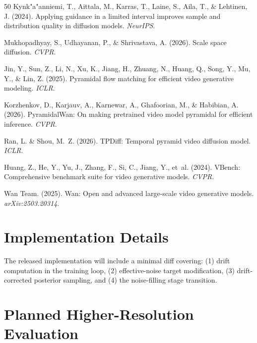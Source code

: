 \documentclass[10pt]{article}
\begin{document}
\begin{thebibliography}{50}
Kynk{"a}{"a}nniemi, T., Aittala, M., Karras, T., Laine, S., Aila, T., \& Lehtinen, J. (2024).
\newblock Applying guidance in a limited interval improves sample and distribution quality in diffusion models.
\newblock \emph{NeurIPS}.

Mukhopadhyay, S., Udhayanan, P., \& Shrivastava, A. (2026).
\newblock Scale space diffusion.
\newblock \emph{CVPR}.

Jin, Y., Sun, Z., Li, N., Xu, K., Jiang, H., Zhuang, N., Huang, Q., Song, Y., Mu, Y., \& Lin, Z. (2025).
\newblock Pyramidal flow matching for efficient video generative modeling.
\newblock \emph{ICLR}.

Korzhenkov, D., Karjauv, A., Karnewar, A., Ghafoorian, M., \& Habibian, A. (2026).
\newblock PyramidalWan: On making pretrained video model pyramidal for efficient inference.
\newblock \emph{CVPR}.

Ran, L. \& Shou, M.~Z. (2026).
\newblock TPDiff: Temporal pyramid video diffusion model.
\newblock \emph{ICLR}.

Huang, Z., He, Y., Yu, J., Zhang, F., Si, C., Jiang, Y., et~al. (2024).
\newblock VBench: Comprehensive benchmark suite for video generative models.
\newblock \emph{CVPR}.

Wan Team. (2025).
\newblock Wan: Open and advanced large-scale video generative models.
\newblock \emph{arXiv:2503.20314}.

\end{thebibliography}

\newpage
\appendix

\section{Implementation Details}
\label{app:implementation}


The released implementation will include a minimal diff covering: (1) drift computation in the training loop, (2) effective-noise target modification, (3) drift-corrected posterior sampling, and (4) the noise-filling stage transition.

\section{Planned Higher-Resolution Evaluation}
\label{app:scaling_512}
\end{document}
